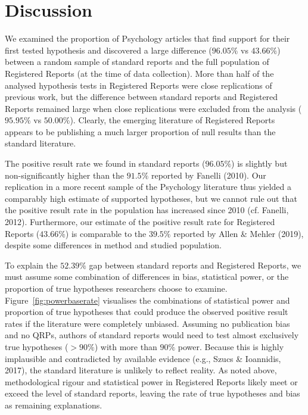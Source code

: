 \documentclass[british,,jou,floatsintext]{apa6}
\begin{document}
\hypertarget{discussion}{%
\section{Discussion}\label{discussion}}

We examined the proportion of Psychology articles that find support for their first tested hypothesis and discovered a large difference (\(96.05 \%\) vs \(43.66 \%\)) between a random sample of standard reports and the full population of Registered Reports (at the time of data collection).
More than half of the analysed hypothesis tests in Registered Reports were close replications of previous work, but the difference between standard reports and Registered Reports remained large when close replications were excluded from the analysis (\(95.95 \%\) vs \(50.00 \%\)).
Clearly, the emerging literature of Registered Reports appears to be publishing a much larger proportion of null results than the standard literature.

The positive result rate we found in standard reports (\(96.05 \%\)) is slightly but non-significantly higher than the \(91.5\%\) reported by Fanelli (2010).
Our replication in a more recent sample of the Psychology literature thus yielded a comparably high estimate of supported hypotheses, but we cannot rule out that the positive result rate in the population has increased since 2010 (cf. Fanelli, 2012).
Furthermore, our estimate of the positive result rate for Registered Reports (\(43.66 \%\)) is comparable to the \(39.5\%\) reported by Allen \& Mehler (2019), despite some differences in method and studied population.

To explain the \(52.39 \%\) gap between standard reports and Registered Reports, we must assume some combination of differences in bias, statistical power, or the proportion of true hypotheses researchers choose to examine.
Figure~\ref{fig:powerbaserate} visualises the combinations of statistical power and proportion of true hypotheses that could produce the observed positive result rates if the literature were completely unbiased.
Assuming no publication bias and no QRPs, authors of standard reports would need to test almost exclusively true hypotheses (\(>90\%\)) with more than \(90\%\) power.
Because this is highly implausible and contradicted by available evidence (e.g., Szucs \& Ioannidis, 2017), the standard literature is unlikely to reflect reality.
As noted above, methodological rigour and statistical power in Registered Reports likely meet or exceed the level of standard reports, leaving the rate of true hypotheses and bias as remaining explanations.
\end{document}

